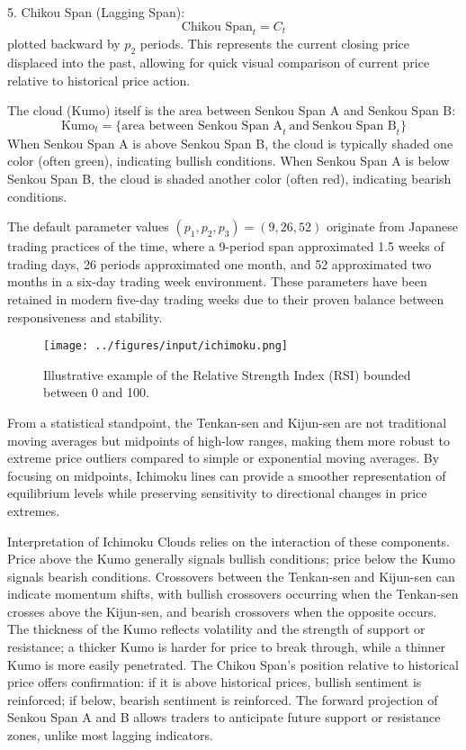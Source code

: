 5. Chikou Span (Lagging Span):
\[
\text{Chikou Span}_t = C_{t}
\]
plotted backward by $p_2$ periods. This represents the current closing price displaced into the past, allowing for quick visual comparison of current price relative to historical price action.

The cloud (Kumo) itself is the area between Senkou Span A and Senkou Span B:
\[
\text{Kumo}_t = \{\text{area between Senkou Span A}_t \ \text{and} \ \text{Senkou Span B}_t\}
\]
When Senkou Span A is above Senkou Span B, the cloud is typically shaded one color (often green), indicating bullish conditions. When Senkou Span A is below Senkou Span B, the cloud is shaded another color (often red), indicating bearish conditions.

The default parameter values $(p_1, p_2, p_3) = (9, 26, 52)$ originate from Japanese trading practices of the time, where a 9-period span approximated 1.5 weeks of trading days, 26 periods approximated one month, and 52 approximated two months in a six-day trading week environment. These parameters have been retained in modern five-day trading weeks due to their proven balance between responsiveness and stability.

\begin{figure}[H]
    \centering
    \texttt{[image: ../figures/input/ichimoku.png]}
    \caption{Illustrative example of the Relative Strength Index (RSI) bounded between 0 and 100.}
\end{figure}

From a statistical standpoint, the Tenkan-sen and Kijun-sen are not traditional moving averages but midpoints of high-low ranges, making them more robust to extreme price outliers compared to simple or exponential moving averages. By focusing on midpoints, Ichimoku lines can provide a smoother representation of equilibrium levels while preserving sensitivity to directional changes in price extremes.

Interpretation of Ichimoku Clouds relies on the interaction of these components. Price above the Kumo generally signals bullish conditions; price below the Kumo signals bearish conditions. Crossovers between the Tenkan-sen and Kijun-sen can indicate momentum shifts, with bullish crossovers occurring when the Tenkan-sen crosses above the Kijun-sen, and bearish crossovers when the opposite occurs. The thickness of the Kumo reflects volatility and the strength of support or resistance; a thicker Kumo is harder for price to break through, while a thinner Kumo is more easily penetrated. The Chikou Span’s position relative to historical price offers confirmation: if it is above historical prices, bullish sentiment is reinforced; if below, bearish sentiment is reinforced. The forward projection of Senkou Span A and B allows traders to anticipate future support or resistance zones, unlike most lagging indicators.

